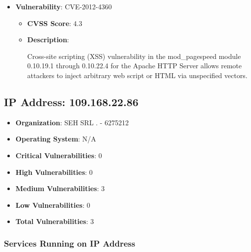 \documentclass{article}
\begin{document}
\begin{itemize}
        \item \textbf{Vulnerability}: CVE-2012-4360
        \begin{itemize}
            \item \textbf{CVSS Score}:  4.3 
            \item \textbf{Description}:
            \parbox[t]{0.9\linewidth}{
                \ttfamily Cross-site scripting (XSS) vulnerability in the mod\_pagespeed module 0.10.19.1 through 0.10.22.4 for the Apache HTTP Server allows remote attackers to inject arbitrary web script or HTML via unspecified vectors.
            }
        \end{itemize}
    
\end{itemize}




\clearpage



\subsection{IP Address: 109.168.22.86}

\begin{itemize}
    \item \textbf{Organization}: SEH SRL . - 6275212
    \item \textbf{Operating System}:  N/A 
    \item \textbf{Critical Vulnerabilities}: 0
    \item \textbf{High Vulnerabilities}: 0
    \item \textbf{Medium Vulnerabilities}: 3
    \item \textbf{Low Vulnerabilities}: 0
    \item \textbf{Total Vulnerabilities}: 3
\end{itemize}

\subsubsection*{Services Running on IP Address}
\end{document}
